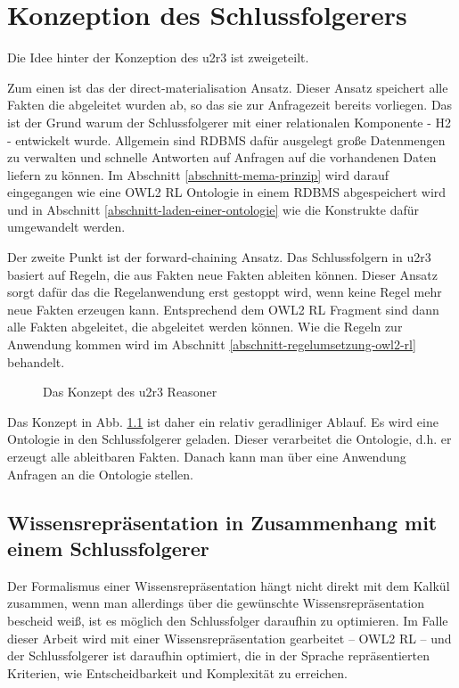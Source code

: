 \chapter{Konzeption des Schlussfolgerers}
Die Idee hinter der Konzeption des u2r3 ist zweigeteilt.

Zum einen ist das der direct-materialisation Ansatz. Dieser Ansatz speichert alle Fakten die abgeleitet wurden ab, so das sie zur Anfragezeit bereits vorliegen. Das ist der Grund warum der Schlussfolgerer mit einer relationalen Komponente - H2 - entwickelt wurde. Allgemein sind RDBMS dafür ausgelegt große Datenmengen zu verwalten und schnelle Antworten auf Anfragen auf die vorhandenen Daten liefern zu können. Im Abschnitt \ref{abschnitt-mema-prinzip} wird darauf eingegangen wie eine OWL2 RL Ontologie in einem RDBMS abgespeichert wird und in Abschnitt \ref{abschnitt-laden-einer-ontologie} wie die Konstrukte dafür umgewandelt werden.

Der zweite Punkt ist der forward-chaining Ansatz. Das Schlussfolgern in u2r3 basiert auf Regeln, die aus Fakten neue Fakten ableiten können. Dieser Ansatz sorgt dafür das die Regelanwendung erst gestoppt wird, wenn keine Regel mehr neue Fakten erzeugen kann. Entsprechend dem OWL2 RL Fragment sind dann alle Fakten abgeleitet, die abgeleitet werden können. Wie die Regeln zur Anwendung kommen wird im Abschnitt \ref{abschnitt-regelumsetzung-owl2-rl} behandelt.

\begin{figure}[htb]
\begin{center}
	\caption{Das Konzept des u2r3 Reasoner}
	\label{image-konzept}
\end{center}
\end{figure}
Das Konzept in Abb. \ref{image-konzept} ist daher ein relativ geradliniger Ablauf. Es wird eine Ontologie in den Schlussfolgerer geladen. Dieser verarbeitet die Ontologie, d.h. er erzeugt alle ableitbaren Fakten. Danach kann man über eine Anwendung Anfragen an die Ontologie stellen.



\section{Wissensrepräsentation in Zusammenhang mit einem Schlussfolgerer}

Der Formalismus einer Wissensrepräsentation hängt nicht direkt mit dem Kalkül zusammen, wenn man allerdings über die gewünschte Wissensrepräsentation bescheid weiß, ist es möglich den Schlussfolger daraufhin zu optimieren. Im Falle dieser Arbeit wird mit einer Wissensrepräsentation gearbeitet -- OWL2 RL -- und der Schlussfolgerer ist daraufhin optimiert, die in der Sprache repräsentierten Kriterien, wie Entscheidbarkeit und Komplexität zu erreichen.

